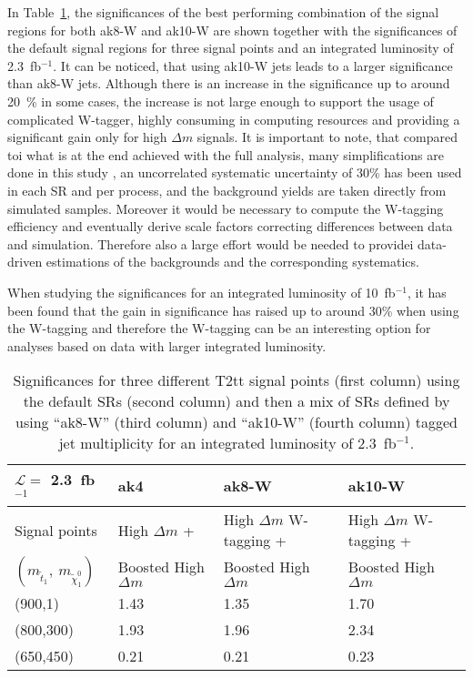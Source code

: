 In Table~\ref{tab:taggingResults}, the significances of the best performing combination of the signal regions for both ak8-W and ak10-W are shown together with the significances of the default signal regions for three signal points and an integrated luminosity of 2.3~fb$^{-1}$. It can be noticed, that using ak10-W jets leads to a larger significance than ak8-W jets. Although there is an increase in the significance up to around 20~\% in some cases, the increase is not large enough to support the usage of complicated W-tagger, highly consuming in computing resources and providing a significant gain only for high $\Delta m$ signals.  It is important to note, that compared toi what is at the end achieved with the full analysis, many simplifications are done in this study , an uncorrelated systematic uncertainty of 30\% has been used in each SR and per process, and the background yields are taken directly from simulated samples. Moreover it would be necessary to compute the W-tagging efficiency and eventually  derive scale factors correcting differences between data and simulation.  Therefore also a large effort would be needed to providei data-driven estimations of the backgrounds and the corresponding systematics. 

When studying the significances for an integrated luminosity of  10~fb$^{-1}$,  it has been found that the gain in significance has raised up to around 30\% when using the W-tagging and therefore the W-tagging can be an interesting option for analyses based on data with larger integrated luminosity. 

\begin{table}[h]
\begin{center}
\begin{tabular}{|l|l|l|l|}
\hline
$\mathcal{L} =$ 2.3~fb$^{-1}$             & ak4~\cite{Sirunyan:2017xse}      & ak8-W & ak10-W \\
\hline
Signal points                       & High $\Delta m$ +           &  High $\Delta m$ W-tagging +  &   High $\Delta m$ W-tagging +  \\
$(m_{\tilde{t}_{1}},~m_{\tilde{\chi}^{0}_{1}})$    &  Boosted High $\Delta m$    & Boosted High $\Delta m$       &   Boosted High $\Delta m$  \\
\hline
\hline
(900,1) &     1.43 & 1.35 & 1.70  \\
\hline
(800,300) &   1.93 & 1.96 & 2.34  \\
\hline
(650,450) &   0.21 & 0.21 & 0.23  \\
\hline
\end{tabular}
\caption[Table caption text]{ Significances for three different T2tt signal points (first column) using the default SRs (second column) and then a mix of SRs defined by using ``ak8-W'' (third column) and ``ak10-W'' (fourth column) tagged jet multiplicity for an integrated luminosity of 2.3~fb$^{-1}$. }
\label{tab:taggingResults}
\end{center}
\end{table}

